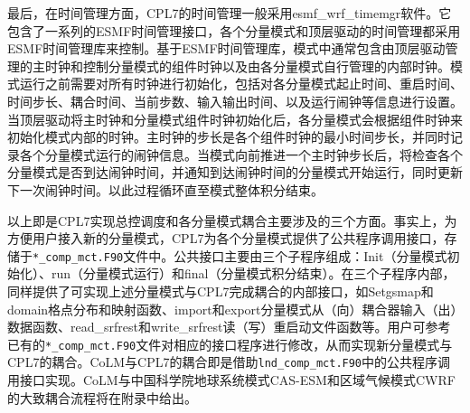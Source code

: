 最后，在时间管理方面，CPL7的时间管理一般采用esmf\_wrf\_timemgr软件。它包含了一系列的ESMF时间管理接口，各个分量模式和顶层驱动的时间管理都采用ESMF时间管理库来控制。基于ESMF时间管理库，模式中通常包含由顶层驱动管理的主时钟和控制分量模式的组件时钟以及由各分量模式自行管理的内部时钟。模式运行之前需要对所有时钟进行初始化，包括对各分量模式起止时间、重启时间、时间步长、耦合时间、当前步数、输入输出时间、以及运行闹钟等信息进行设置。当顶层驱动将主时钟和分量模式组件时钟初始化后，各分量模式会根据组件时钟来初始化模式内部的时钟。主时钟的步长是各个组件时钟的最小时间步长，并同时记录各个分量模式运行的闹钟信息。当模式向前推进一个主时钟步长后，将检查各个分量模式是否到达闹钟时间，并通知到达闹钟时间的分量模式开始运行，同时更新下一次闹钟时间。以此过程循环直至模式整体积分结束。

以上即是CPL7实现总控调度和各分量模式耦合主要涉及的三个方面。事实上，为方便用户接入新的分量模式，CPL7为各个分量模式提供了公共程序调用接口，存储于\texttt{*\_comp\_mct.F90}文件中。公共接口主要由三个子程序组成：Init（分量模式初始化）、run（分量模式运行）和final（分量模式积分结束）。在三个子程序内部，同样提供了可实现上述分量模式与CPL7完成耦合的内部接口，如Setgsmap和domain格点分布和映射函数、import和export分量模式从（向）耦合器输入（出）数据函数、read\_srfrest和write\_srfrest读（写）重启动文件函数等。用户可参考已有的\texttt{*\_comp\_mct.F90}文件对相应的接口程序进行修改，从而实现新分量模式与CPL7的耦合。CoLM与CPL7的耦合即是借助\texttt{lnd\_comp\_mct.F90}中的公共程序调用接口实现。CoLM与中国科学院地球系统模式CAS-ESM和区域气候模式CWRF的大致耦合流程将在附录中给出。
